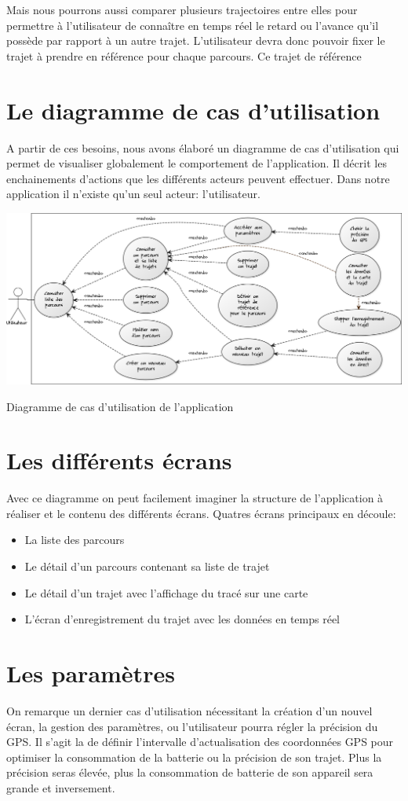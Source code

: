 Mais nous pourrons aussi comparer plusieurs trajectoires entre elles pour permettre à l'utilisateur de connaître en temps réel le retard ou l'avance qu'il possède par rapport à un autre trajet. L'utilisateur devra donc pouvoir fixer le trajet à prendre en référence pour chaque parcours. Ce trajet de référence

\section{Le diagramme de cas d'utilisation}
A partir de ces besoins, nous avons élaboré un diagramme de cas d'utilisation qui permet de visualiser globalement le comportement de l'application. Il décrit les enchainements d'actions que les différents acteurs peuvent effectuer. Dans notre application il n'existe qu'un seul acteur: l'utilisateur.

\begin{img}
  \includegraphics[scale=0.35]{img/DUC.png}
  \caption{Diagramme de cas d'utilisation de l'application}
\end{img}

\section{Les différents écrans}
Avec ce diagramme on peut facilement imaginer la structure de l'application à réaliser et le contenu des différents écrans. Quatres écrans principaux en découle:\bigskip

\begin{itemize}
  \item La liste des parcours
  \item Le détail d'un parcours contenant sa liste de trajet
  \item Le détail d'un trajet avec l'affichage du tracé sur une carte
  \item L'écran d'enregistrement du trajet avec les données en temps réel 
\end{itemize}\bigskip

\section{Les paramètres}
On remarque un dernier cas d'utilisation nécessitant la création d'un nouvel écran, la gestion des paramètres, ou l'utilisateur pourra régler la précision du GPS. Il s'agit la de définir l'intervalle d'actualisation des coordonnées GPS pour optimiser la consommation de la batterie ou la précision de son trajet. Plus la précision seras élevée, plus la consommation de batterie de son appareil sera grande et inversement.
 